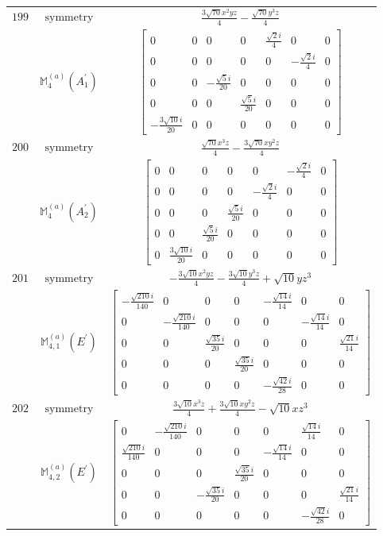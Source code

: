 \documentclass[fleqn,8pt,landscape]{jsarticle}
\begin{document}
\begin{longtable}{ccc}
$ 199 $ & $ \text{symmetry} $ & $ \frac{3 \sqrt{70} x^{2} y z}{4} - \frac{\sqrt{70} y^{3} z}{4} $ \\
$  $ & $ \mathbb{M}_{4}^{(a)}(A_{1}^{\prime}) $ & $ \begin{bmatrix} 0 & 0 & 0 & 0 & \frac{\sqrt{2} i}{4} & 0 & 0 \\ 0 & 0 & 0 & 0 & 0 & - \frac{\sqrt{2} i}{4} & 0 \\ 0 & 0 & - \frac{\sqrt{5} i}{20} & 0 & 0 & 0 & 0 \\ 0 & 0 & 0 & \frac{\sqrt{5} i}{20} & 0 & 0 & 0 \\ - \frac{3 \sqrt{10} i}{20} & 0 & 0 & 0 & 0 & 0 & 0 \end{bmatrix} $ \\ \hline
$ 200 $ & $ \text{symmetry} $ & $ \frac{\sqrt{70} x^{3} z}{4} - \frac{3 \sqrt{70} x y^{2} z}{4} $ \\
$  $ & $ \mathbb{M}_{4}^{(a)}(A_{2}^{\prime}) $ & $ \begin{bmatrix} 0 & 0 & 0 & 0 & 0 & - \frac{\sqrt{2} i}{4} & 0 \\ 0 & 0 & 0 & 0 & - \frac{\sqrt{2} i}{4} & 0 & 0 \\ 0 & 0 & 0 & \frac{\sqrt{5} i}{20} & 0 & 0 & 0 \\ 0 & 0 & \frac{\sqrt{5} i}{20} & 0 & 0 & 0 & 0 \\ 0 & \frac{3 \sqrt{10} i}{20} & 0 & 0 & 0 & 0 & 0 \end{bmatrix} $ \\ \hline
$ 201 $ & $ \text{symmetry} $ & $ - \frac{3 \sqrt{10} x^{2} y z}{4} - \frac{3 \sqrt{10} y^{3} z}{4} + \sqrt{10} y z^{3} $ \\
$  $ & $ \mathbb{M}_{4,1}^{(a)}(E^{\prime}) $ & $ \begin{bmatrix} - \frac{\sqrt{210} i}{140} & 0 & 0 & 0 & - \frac{\sqrt{14} i}{14} & 0 & 0 \\ 0 & - \frac{\sqrt{210} i}{140} & 0 & 0 & 0 & - \frac{\sqrt{14} i}{14} & 0 \\ 0 & 0 & \frac{\sqrt{35} i}{20} & 0 & 0 & 0 & \frac{\sqrt{21} i}{14} \\ 0 & 0 & 0 & \frac{\sqrt{35} i}{20} & 0 & 0 & 0 \\ 0 & 0 & 0 & 0 & - \frac{\sqrt{42} i}{28} & 0 & 0 \end{bmatrix} $ \\ \hline
$ 202 $ & $ \text{symmetry} $ & $ \frac{3 \sqrt{10} x^{3} z}{4} + \frac{3 \sqrt{10} x y^{2} z}{4} - \sqrt{10} x z^{3} $ \\
$  $ & $ \mathbb{M}_{4,2}^{(a)}(E^{\prime}) $ & $ \begin{bmatrix} 0 & - \frac{\sqrt{210} i}{140} & 0 & 0 & 0 & \frac{\sqrt{14} i}{14} & 0 \\ \frac{\sqrt{210} i}{140} & 0 & 0 & 0 & - \frac{\sqrt{14} i}{14} & 0 & 0 \\ 0 & 0 & 0 & \frac{\sqrt{35} i}{20} & 0 & 0 & 0 \\ 0 & 0 & - \frac{\sqrt{35} i}{20} & 0 & 0 & 0 & \frac{\sqrt{21} i}{14} \\ 0 & 0 & 0 & 0 & 0 & - \frac{\sqrt{42} i}{28} & 0 \end{bmatrix} $ \\ \hline

\end{longtable}
\end{document}
